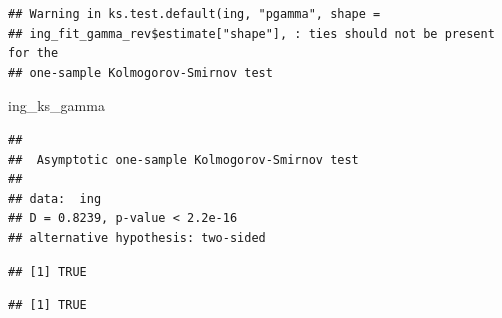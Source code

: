 \documentclass[
]{article}
\newenvironment{Shaded}{\begin{snugshade}}{\end{snugshade}}
\newcommand{\AttributeTok}[1]{\textcolor[rgb]{0.13,0.29,0.53}{#1}}
\newcommand{\FloatTok}[1]{\textcolor[rgb]{0.00,0.00,0.81}{#1}}
\newcommand{\FunctionTok}[1]{\textcolor[rgb]{0.13,0.29,0.53}{\textbf{#1}}}
\newcommand{\NormalTok}[1]{#1}
\newcommand{\OtherTok}[1]{\textcolor[rgb]{0.56,0.35,0.01}{#1}}
\newcommand{\SpecialCharTok}[1]{\textcolor[rgb]{0.81,0.36,0.00}{\textbf{#1}}}
\newcommand{\StringTok}[1]{\textcolor[rgb]{0.31,0.60,0.02}{#1}}
\begin{document}
\begin{verbatim}
## Warning in ks.test.default(ing, "pgamma", shape =
## ing_fit_gamma_rev$estimate["shape"], : ties should not be present for the
## one-sample Kolmogorov-Smirnov test
\end{verbatim}

\begin{Shaded}
\begin{Highlighting}[]
\NormalTok{ing\_ks\_gamma}
\end{Highlighting}
\end{Shaded}

\begin{verbatim}
## 
##  Asymptotic one-sample Kolmogorov-Smirnov test
## 
## data:  ing
## D = 0.8239, p-value < 2.2e-16
## alternative hypothesis: two-sided
\end{verbatim}

\begin{Shaded}
\end{Shaded}

\begin{verbatim}
## [1] TRUE
\end{verbatim}

\begin{Shaded}
\end{Shaded}

\begin{verbatim}
## [1] TRUE
\end{verbatim}

\begin{Shaded}
\end{Shaded}
\end{document}

